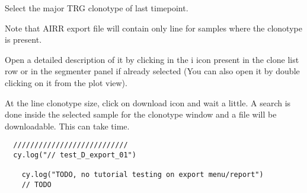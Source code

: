 Select the major TRG clonotype of last timepoint.

Note that AIRR export file will contain only line for samples where the clonotype is present.



Open a detailed description of it by clicking in the {i icon} present in the clone list row or in the segmenter panel if already selected (You can also open it by double clicking on it from the plot view).


At the line clonotype size, click on download icon and wait a little. 
A search is done inside the selected sample for the clonotype window and a file will be downloadable. 
This can take time. 

\begin{verbatim}
  ///////////////////////////
  cy.log("// test_D_export_01")

    cy.log("TODO, no tutorial testing on export menu/report")
    // TODO

\end{verbatim}
